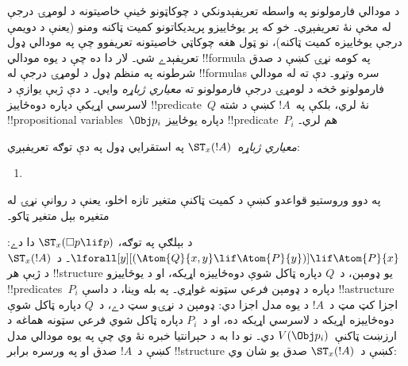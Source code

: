 \documentclass[../../../include/open-logic-section]{subfiles}
\begin{document}


د مودالي فارمولونو په واسطه تعريفېدونکي د چوکاټونو ځينې
خاصيتونه د لومړۍ درجې له مخې نۀ تعريفېږي۔ خو که پر يوځاييزو پريديکاتونو
کميت ټاکنه ومنو (يعنې د دويمې درجې يوځاييزه کميت ټاکنه)، نو
ټول هغه چوکاټي خاصيتونه تعريفوو چې په مودالي ډول تعريفېدے شي۔
لار دا ده چې د يوه مودالي !!{formula} په کومه نړۍ کښې د صدق
شرطونه په منظم ډول د لومړۍ درجې له !!{formula}s سره وتړو۔
دې ته له مودالي فارمولونو څخه د لومړۍ درجې فارمولونو ته
\emph{معياري ژباړه} وايي۔ د دې ژبې يوازې د لاسرسي اړيکې
دپاره دوه‌ځاييز !!{predicate}~$Q$ نۀ لري، بلکې
په~$!A$ کښې د شته !!{propositional variable}s~$\Obj p_i$
دپاره يوځاييز !!{predicate}~$P_i$ هم لري۔

\begin{defn}
  \emph{معياري ژباړه}~$\ST_x(!A)$ په استقرايي ډول
  په دې توګه تعريفېږي:
  \begin{enumerate}
  \item {}
  \end{enumerate}
  په دوو وروستيو قواعدو کښې د کميت ټاکنې متغير تازه اخلو،
  يعنې د روانې نړۍ له متغيره بېل متغير ټاکو۔
\end{defn}

د بېلګې په توګه، $\ST_x(\Box p \lif p)$ دا دے:
$\lforall[y][(\Atom{Q}{x,y}
  \lif \Atom{P}{y})] \lif \Atom{P}{x}$۔
د~$\ST_x(!A)$ د ژبې هر !!{structure} يو ډومېن، د~$Q$
دپاره ټاکل شوې دوه‌ځاييزه اړيکه، او د يوځاييزو
!!{predicate}s~$P_i$ دپاره د ډومېن فرعي سټونه غواړي۔
په بله وينا، د داسې !!a{structure} اجزا کټ مټ د~$!A$
د يوه مدل اجزا دي: ډومېن د نړۍو سټ دے، د~$Q$ دپاره
ټاکل شوې دوه‌ځاييزه اړيکه د لاسرسي اړيکه ده، او
د~$P_i$ دپاره ټاکل شوي فرعي سټونه هماغه د
ارزښت ټاکنې~$V(\Obj p_i)$ دي۔ نو دا به د حېرانتيا
خبره نۀ وي چې په يوه مودالي مدل کښې د~$!A$ صدق او په
ورسره برابر !!{structure} کښې د~$\ST_x(!A)$ صدق يو شان وي:
\end{document}
